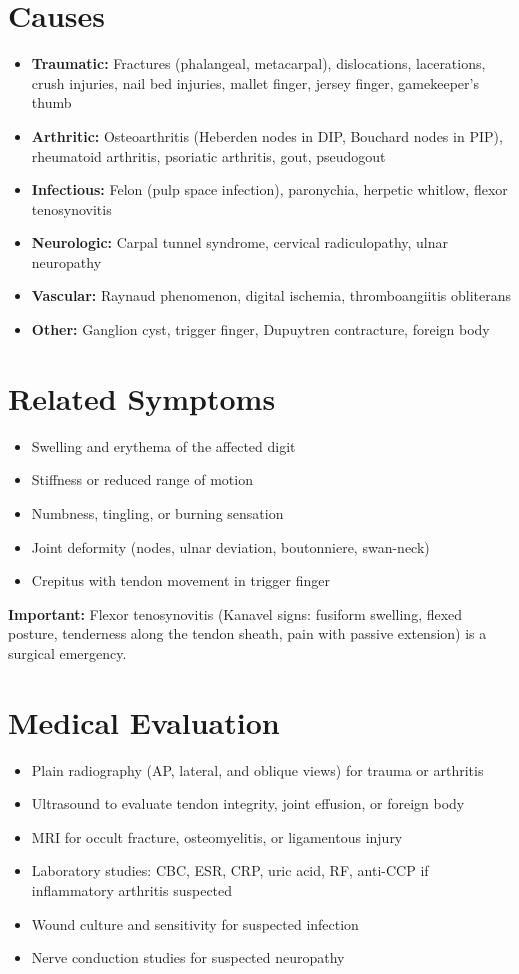 \section*{Causes}
\begin{itemize}
  \item \textbf{Traumatic:} Fractures (phalangeal, metacarpal), dislocations, lacerations, crush injuries, nail bed injuries, mallet finger, jersey finger, gamekeeper's thumb
  \item \textbf{Arthritic:} Osteoarthritis (Heberden nodes in DIP, Bouchard nodes in PIP), rheumatoid arthritis, psoriatic arthritis, gout, pseudogout
  \item \textbf{Infectious:} Felon (pulp space infection), paronychia, herpetic whitlow, flexor tenosynovitis
  \item \textbf{Neurologic:} Carpal tunnel syndrome, cervical radiculopathy, ulnar neuropathy
  \item \textbf{Vascular:} Raynaud phenomenon, digital ischemia, thromboangiitis obliterans
  \item \textbf{Other:} Ganglion cyst, trigger finger, Dupuytren contracture, foreign body
\end{itemize}

\section*{Related Symptoms}
\begin{itemize}
  \item Swelling and erythema of the affected digit
  \item Stiffness or reduced range of motion
  \item Numbness, tingling, or burning sensation
  \item Joint deformity (nodes, ulnar deviation, boutonniere, swan-neck)
  \item Crepitus with tendon movement in trigger finger
\end{itemize}
\textbf{Important:} Flexor tenosynovitis (Kanavel signs: fusiform swelling, flexed posture, tenderness along the tendon sheath, pain with passive extension) is a surgical emergency.

\section*{Medical Evaluation}
\begin{itemize}
  \item Plain radiography (AP, lateral, and oblique views) for trauma or arthritis
  \item Ultrasound to evaluate tendon integrity, joint effusion, or foreign body
  \item MRI for occult fracture, osteomyelitis, or ligamentous injury
  \item Laboratory studies: CBC, ESR, CRP, uric acid, RF, anti-CCP if inflammatory arthritis suspected
  \item Wound culture and sensitivity for suspected infection
  \item Nerve conduction studies for suspected neuropathy
\end{itemize}

